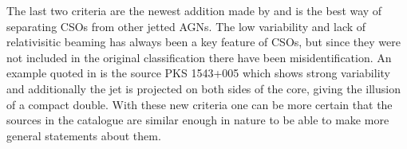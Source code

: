 The last two criteria are the newest addition made by \cite{kiehlmann2023compact} and is the best way of separating CSOs from other jetted AGNs. The low variability and lack of relativisitic beaming has always been a key feature of CSOs, but since they were not included in the original classification there have been misidentification. An example quoted in \cite{kiehlmann2023compact} is the source PKS 1543+005 which shows strong variability and additionally the jet is projected on both sides of the core, giving the illusion of a compact double. With these new criteria one can be more certain that the sources in the catalogue are similar enough in nature to be able to make more general statements about them.








